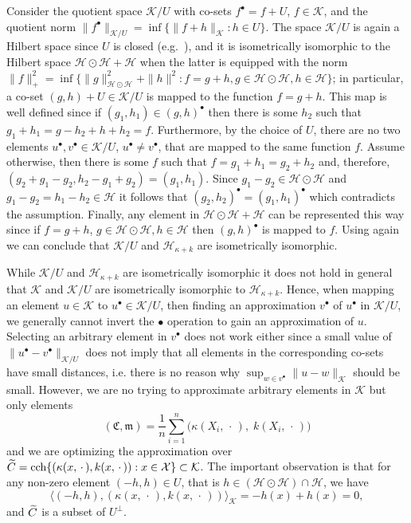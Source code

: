 \documentclass[10pt]{amsart}
\theoremstyle{definition}\newtheorem{defi}[theo]{Definition}\newtheorem{rema}[theo]{Remark}\newtheorem{exam}[theo]{Example}\newtheorem{exem}[theo]{Example}\newtheorem{nota}[theo]{Notation}
\theoremstyle{remark}
\DeclareMathOperator{\cch}{cch}
\newcommand{\X}{\mathcal{X}}
\newcommand{\cH}{\mathcal{H}}
\newcommand{\clK}{\mathcal{K}}
\newcommand{\fkC}{\mathfrak{C}}
\newcommand{\mean}{\mathfrak{m}}
\let\oldtilde\tilde
\renewcommand*{\tilde}[1]{\mathchoice{\widetilde{#1}}{\widetilde{#1}}{\oldtilde{#1}}{\oldtilde{#1}}}
\begin{document}
Consider the quotient space $\clK / U$ with co-sets $f^\bullet = f + U$, $f\in \clK$, and the quotient norm $\|f^\bullet \|_{\clK/U} = \inf\{\|f+h\|_\clK : h \in U \}$. The space $\clK/U$ is again a Hilbert space since $U$ is closed (e.g.~\cite[Section~III.4]{REED72}), and it is isometrically isomorphic to the Hilbert space $\cH \odot \cH + \cH$ when the latter is equipped with the norm $\|f\|_+^2 = \inf \{\|g\|^2_{\cH \odot \cH} + \|h\|^2 : f=g+h, g \in \cH \odot \cH, h \in \cH \} $; in particular, a co-set $(g,h) + U \in \clK/U$ is mapped to the function $f = g + h$. This map is well defined since if $(g_1,h_1) \in (g,h)^\bullet$ then there is some $h_2$ such that $g_1 + h_1 = g - h_2 + h + h_2 = f$. Furthermore, by the choice of $U$, there are no two elements $u^\bullet,v^\bullet \in \clK/U$, $u^\bullet \not= v^\bullet$, that are mapped to the same function $f$. Assume otherwise, then there is some $f$ such that $f = g_1 +h_1 = g_2 + h_2$ and, therefore, $(g_2 + g_1 - g_2, h_2 - g_1 + g_2) = (g_1, h_1)$. Since $g_1 - g_2 \in \cH \odot \cH$ and $g_1 - g_2 = h_1 - h_2 \in \cH$ it follows that $(g_2,h_2)^\bullet = (g_1, h_1)^\bullet$ which contradicts the assumption. Finally, any element in $\cH \odot \cH + \cH$ can be represented this way since if $f = g + h$, $g \in \cH \odot \cH, h \in \cH$ then $(g,h)^\bullet$ is mapped to $f$. Using again~\cite[Theorem p.~353]{ARON50} we can conclude that $\clK/U$ and $\cH_{\kappa + k}$ are isometrically isomorphic.

While $\clK/U$ and $\cH_{\kappa + k}$ are isometrically isomorphic it does not hold in general that $\clK$ and $\clK/U$ are isometrically isomorphic to $\cH_{\kappa + k}$. Hence, when mapping an element $u\in \clK$ to $u^\bullet \in \clK/U$, then finding an approximation $v^\bullet$ of $u^\bullet$ in $\clK/U$, we generally cannot invert the $\bullet$ operation to gain an approximation of $u$. Selecting an arbitrary element in $v^\bullet$ does not work either since a small value of $\|u^\bullet - v^\bullet\|_{\clK/U}$ does not imply that all elements in the corresponding co-sets have small distances, i.e. there is no reason why $\sup_{w\in v^\bullet} \|u - w\|_\clK$ should be small. However, we are no trying to approximate arbitrary elements in $\clK$ but only elements
\[
(\fkC,\mean) = \frac{1}{n} \sum_{i=1}^n \bigl(\kappa(X_i,\,\cdot\,),\;k(X_i,\,\cdot\,)\bigr)
\]
and we are optimizing the approximation over $\tilde C = \cch \{(\kappa(x,\,\cdot\,), k(x,\,\cdot\,)) : x\in\linebreak \X \} \subset \clK$. The important observation is that for any non-zero element $(-h,h) \in U$, that is $h\in (\cH \odot \cH) \cap \cH$, we have
\[
\bigl\langle (-h,h), (\kappa(x,\,\cdot\,), k(x,\,\cdot\,)) \bigr\rangle_\clK = -h(x) + h(x) = 0,
\]
and $\tilde C$ is a subset of $U^\perp$.
\end{document}
